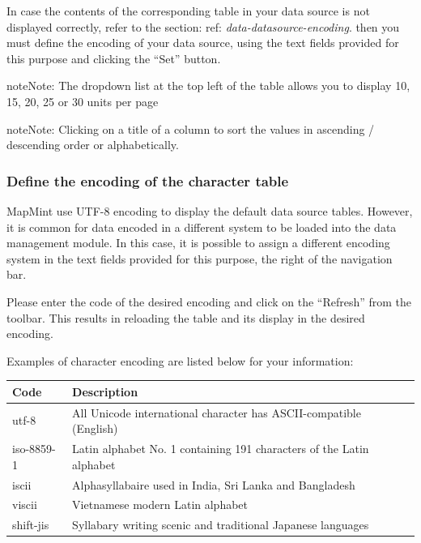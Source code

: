 \documentclass[letterpaper,10pt,english]{sphinxmanual}
\begin{document}
In case the contents of the corresponding table in your data source is not displayed correctly, refer to the section: ref: \emph{data-datasource-encoding}. then you must define the encoding of your data source, using the text fields provided for this purpose and clicking the ``Set'' button.

\begin{notice}{note}{Note:}
The dropdown list at the top left of the table allows you to display 10, 15, 20, 25 or 30 units per page
\end{notice}

\begin{notice}{note}{Note:}
Clicking on a title of a column to sort the values in ascending / descending order or alphabetically.
\end{notice}


\subsubsection{Define the encoding of the character table}
\label{data/datasources:definir-l-encodage-des-caracteres-de-la-table}
MapMint use UTF-8 encoding to display the default data source tables. However, it is common for data encoded in a different system to be loaded into the data management module. In this case, it is possible to assign a different encoding system in the text fields provided for this purpose, the right of the navigation bar.

Please enter the code of the desired encoding and click on the ``Refresh'' from the toolbar. This results in reloading the table and its display in the desired encoding.

Examples of character encoding are listed below for your information:

\begin{tabulary}{\linewidth}{|L|L|}
\hline

\textbf{Code}
 & 
\textbf{Description}
\\
\hline
utf-8
 & 
All Unicode international character has ASCII-compatible (English)
\\
\hline
iso-8859-1
 & 
Latin alphabet No. 1 containing 191 characters of the Latin alphabet
\\
\hline
iscii
 & 
Alphasyllabaire used in India, Sri Lanka and Bangladesh
\\
\hline
viscii
 & 
Vietnamese modern Latin alphabet
\\
\hline
shift-jis
 & 
Syllabary writing scenic and traditional Japanese languages
\\
\hline\end{tabulary}
\end{document}
